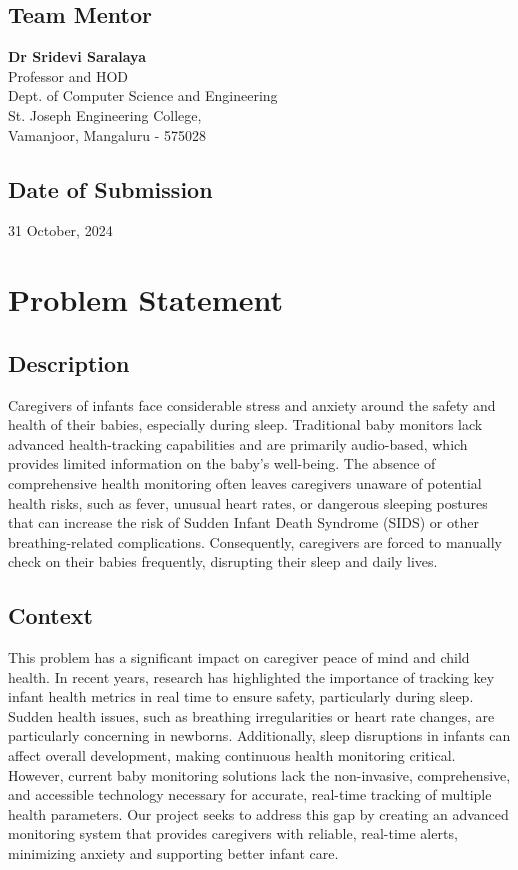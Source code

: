 \documentclass[12pt,a4paper]{report}
\begin{document}
\section{Team Mentor}
\textbf{Dr Sridevi Saralaya} \\ Professor and HOD \\ Dept. of Computer Science and Engineering \\ St. Joseph Engineering College, \\ Vamanjoor, Mangaluru - 575028

\section{Date of Submission}
31 October, 2024

\chapter{Problem Statement}

\section{Description}
Caregivers of infants face considerable stress and anxiety around the safety and health of their babies, especially during sleep. Traditional baby monitors lack advanced health-tracking capabilities and are primarily audio-based, which provides limited information on the baby's well-being. The absence of comprehensive health monitoring often leaves caregivers unaware of potential health risks, such as fever, unusual heart rates, or dangerous sleeping postures that can increase the risk of Sudden Infant Death Syndrome (SIDS) or other breathing-related complications. Consequently, caregivers are forced to manually check on their babies frequently, disrupting their sleep and daily lives.

\section{Context}
This problem has a significant impact on caregiver peace of mind and child health. In recent years, research has highlighted the importance of tracking key infant health metrics in real time to ensure safety, particularly during sleep. Sudden health issues, such as breathing irregularities or heart rate changes, are particularly concerning in newborns. Additionally, sleep disruptions in infants can affect overall development, making continuous health monitoring critical. However, current baby monitoring solutions lack the non-invasive, comprehensive, and accessible technology necessary for accurate, real-time tracking of multiple health parameters. Our project seeks to address this gap by creating an advanced monitoring system that provides caregivers with reliable, real-time alerts, minimizing anxiety and supporting better infant care.
\end{document}
